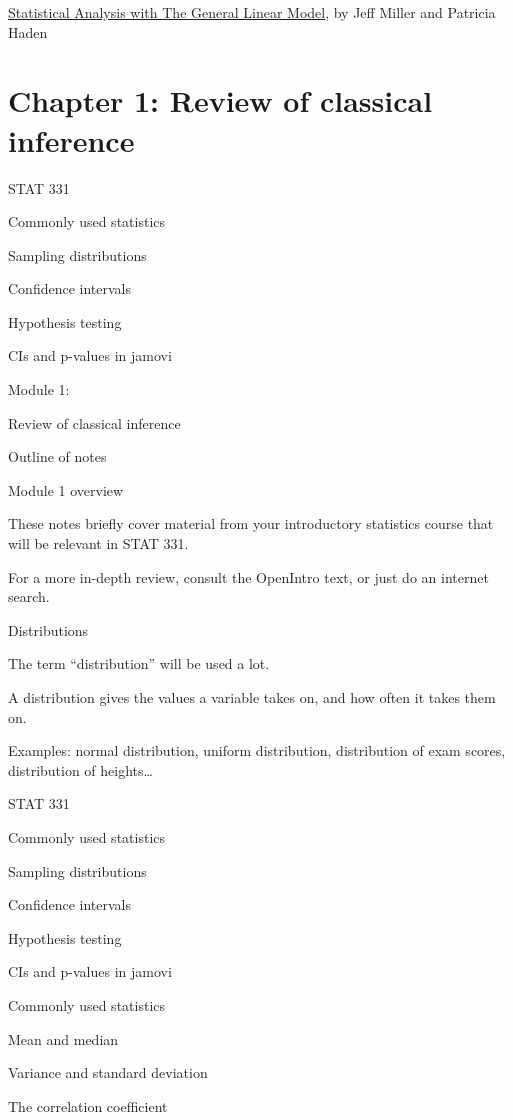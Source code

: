 \documentclass[
  letterpaper,
  DIV=11,
  numbers=noendperiod]{scrreprt}
\begin{document}
\href{https://drive.google.com/file/d/0B1fyuTuvj3YoaFdUR3FZaXNuNXc/view?resourcekey=0-plOmKmQ0TIyMjlfBY3OiyQ}{Statistical
Analysis with The General Linear Model}, by Jeff Miller and Patricia
Haden


\hypertarget{chapter-1-review-of-classical-inference}{%
\chapter{Chapter 1: Review of classical
inference}\label{chapter-1-review-of-classical-inference}}

STAT 331

Commonly used statistics

Sampling distributions

Confidence intervals

Hypothesis testing

CIs and p-values in jamovi

Module 1:

Review of classical inference

Outline of notes

Module 1 overview

These notes briefly cover material from your introductory statistics
course that will be relevant in STAT 331.

For a more in-depth review, consult the OpenIntro text, or just do an
internet search.

Distributions

The term ``distribution'' will be used a lot.

A distribution gives the values a variable takes on, and how often it
takes them on.

Examples: normal distribution, uniform distribution, distribution of
exam scores, distribution of heights\ldots{}

STAT 331

Commonly used statistics

Sampling distributions

Confidence intervals

Hypothesis testing

CIs and p-values in jamovi

Commonly used statistics

Mean and median

Variance and standard deviation

The correlation coefficient
\end{document}
